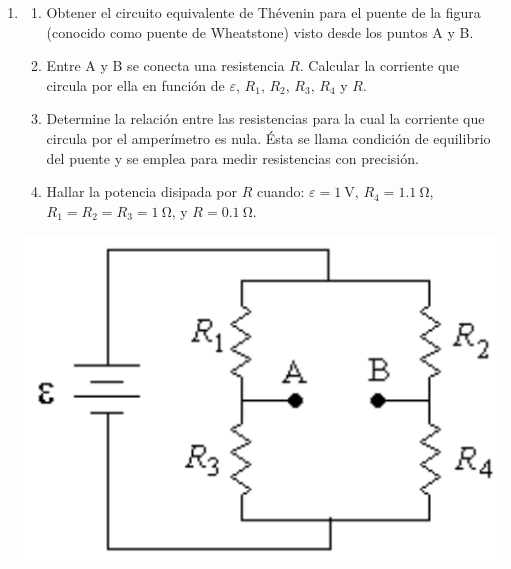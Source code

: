 \documentclass[11pt,spanish,a4paper]{article}
\begin{document}
\begin{enumerate}
	\item \begin{minipage}[t][4.5cm]{0.6\textwidth}
	\begin{enumerate}
		\item Obtener el circuito equivalente de Thévenin para el puente de la figura (conocido como puente de Wheatstone) visto desde los puntos A y B.
		\item Entre A y B se conecta una resistencia \(R\).
			Calcular la corriente que circula por ella en función de \(\varepsilon\), \(R_1\), \(R_2\), \(R_ 3\), \(R_4\) y \(R\).
		\item Determine la relación entre las resistencias para la cual la corriente que circula por el amperímetro es nula.
			Ésta se llama condición de equilibrio del puente y se emplea para medir resistencias con precisión.
		\item Hallar la potencia disipada por \(R\) cuando: \(\varepsilon= \SI{1}{\volt}\), \(R_4= \SI{1.1}{\ohm}\), \(R_1= R_2= R_3= \SI{1}{\ohm}\), y \(R= \SI{0.1}{\ohm}\).
	\end{enumerate}
    \end{minipage}
    \begin{minipage}[c][1em][t]{0.35\textwidth}
            \includegraphics[width=\textwidth]{p3e06}
    \end{minipage}





\end{enumerate}
\end{document}
